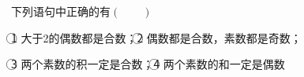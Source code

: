 下列语句中正确的有\hfill$\left(\qquad\right)$

\textcircled{1} 大于2的偶数都是合数；\textcircled{2} 偶数都是合数，素数都是奇数；

\textcircled{3} 两个素数的积一定是合数；\textcircled{4} 两个素数的和一定是偶数

